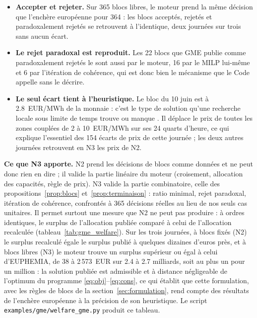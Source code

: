 \documentclass[a4paper,12pt]{article}
\theoremstyle{definition}
\begin{document}
\begin{itemize}
\item \textbf{Accepter et rejeter.} Sur 365 blocs libres, le moteur prend la même décision que l'enchère européenne pour 364 : les blocs acceptés, rejetés et paradoxalement rejetés se retrouvent à l'identique, deux journées sur trois sans aucun écart.
\item \textbf{Le rejet paradoxal est reproduit.} Les 22 blocs que GME publie comme paradoxalement rejetés le sont aussi par le moteur, 16 par le MILP lui-même et 6 par l'itération de cohérence, qui est donc bien le mécanisme que le Code appelle sans le décrire.
\item \textbf{Le seul écart tient à l'heuristique.} Le bloc du 10 juin est à 2.8~EUR/MWh de la monnaie : c'est le type de solution qu'une recherche locale sous limite de temps trouve ou manque \citep[§7.4, §7.10]{euphemia2025}. Il déplace le prix de toutes les zones couplées de 2 à 10~EUR/MWh sur ses 24 quarts d'heure, ce qui explique l'essentiel des 154 écarts de prix de cette journée ; les deux autres journées retrouvent en N3 les prix de N2.
\end{itemize}

\textbf{Ce que N3 apporte.} N2 prend les décisions de blocs comme données et ne peut donc rien en dire ; il valide la partie linéaire du moteur (croisement, allocation des capacités, règle de prix). N3 valide la partie combinatoire, celle des propositions~\ref{prop:blocs} et~\ref{prop:terminaison} : ratio minimal, rejet paradoxal, itération de cohérence, confrontés à 365 décisions réelles au lieu de nos seuls cas unitaires. Il permet surtout une mesure que N2 ne peut pas produire : à ordres identiques, le surplus de l'allocation publiée comparé à celui de l'allocation recalculée (tableau~\ref{tab:gme_welfare}). Sur les trois journées, à blocs fixés (N2) le surplus recalculé égale le surplus publié à quelques dizaines d'euros près, et à blocs libres (N3) le moteur trouve un surplus supérieur ou égal à celui d'EUPHEMIA, de 38 à 2\,573~EUR sur 2.4 à 2.7 milliards, soit au plus un pour un million : la solution publiée est admissible et à distance négligeable de l'optimum du programme \eqref{eq:obj}--\eqref{eq:cons}, ce qui établit que cette formulation, avec les règles de blocs de la section~\ref{sec:formulation}, rend compte des résultats de l'enchère européenne à la précision de son heuristique. Le script \texttt{examples/gme/welfare\_gme.py} produit ce tableau.
\end{document}
